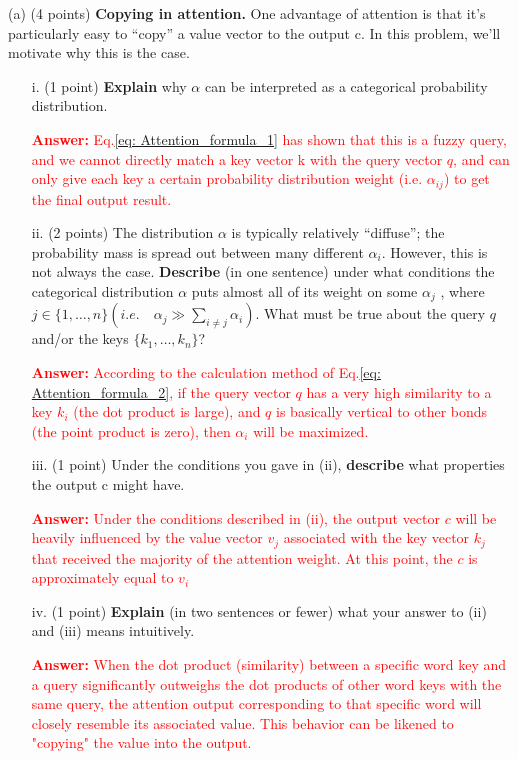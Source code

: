 \documentclass[letterpaper,12pt]{article}
\begin{document}
	\noindent(a) (4 points) \textbf{Copying in attention.} One advantage of attention is that it's particularly easy to “copy” a value vector to the output c. In this problem, we'll motivate why this is the case.
		
	\begin{itemize}
	\item [i.]
	(1 point) \textbf{Explain} why $\alpha$ can be interpreted as a categorical probability distribution.
			
	\textcolor{red}{\textbf{Answer:} Eq.\ref{eq: Attention_formula_1} has shown that this is a fuzzy query, and we cannot directly match a key vector k with the query vector $q$, and can only give each key a certain probability distribution weight (i.e. $\alpha_{ij}$) to get the final output result.}

	\item [ii.]
	(2 points) The distribution $\alpha$ is typically relatively “diffuse”; the probability mass is spread out between many different $\alpha_i$. However, this is not always the case. \textbf{Describe} (in one sentence) under what conditions the categorical distribution $\alpha$ puts almost all of its weight on some $\alpha_j$ , where $j \in \{1, \ldots , n\} (i.e. \quad \alpha_j \gg \sum_{i\neq j} \alpha_i)$. What must be true about the query $q$ and/or the keys $\{k_1, \ldots , k_n\}$?
			
	\textcolor{red}{\textbf{Answer:} According to the calculation method of Eq.\ref{eq: Attention_formula_2}, if the query vector $q$ has a very high similarity to a key $k_i$ (the dot product is large), and $q$ is basically vertical to other bonds (the point product is zero), then $\alpha_i$ will be maximized.}

	\item [iii.]
	(1 point) Under the conditions you gave in (ii), \textbf{describe} what properties the output c might have.
			
	\textcolor{red}{\textbf{Answer:} Under the conditions described in (ii), the output vector $c$ will be heavily influenced by the value vector $v_j$ associated with the key vector $k_j$ that received the majority of the attention weight. At this point, the $c$ is approximately equal to $v_i$}

    \item [iv.]
	(1 point) \textbf{Explain} (in two sentences or fewer) what your answer to (ii) and (iii) means intuitively.
			
	\textcolor{red}{\textbf{Answer:} When the dot product (similarity) between a specific word key and a query significantly outweighs the dot products of other word keys with the same query, the attention output corresponding to that specific word will closely resemble its associated value. This behavior can be likened to "copying" the value into the output.}
	\end{itemize}	
		
\end{document}
